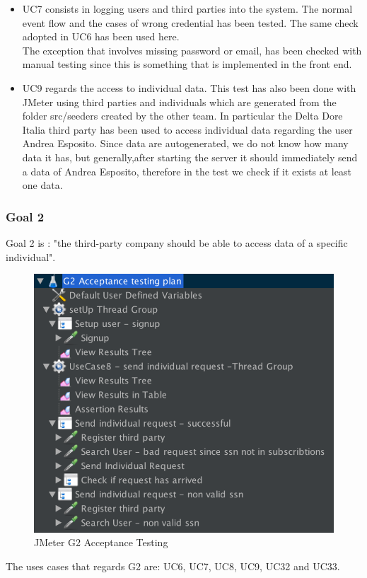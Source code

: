 \begin{itemize}
\item UC7 consists in logging users and third parties into the system. The normal event flow and the cases of wrong credential has been
tested.
The same check adopted in UC6 has been used here. \\ 
The exception that involves missing password or email, has been checked with manual testing since this is something that is implemented in the front 
end.

\item UC9 regards the access to individual data. This test has also been done with JMeter using third parties and individuals which are generated from the folder src/seeders created by the other team. In particular the Delta Dore Italia third party has been used to access individual data regarding the user Andrea Esposito. Since data are autogenerated, we do not know how many data it has, but generally,after starting the server it should immediately send a data of Andrea Esposito, therefore in the test we check if it exists at least one data.

\end{itemize}


\subsubsection{Goal 2}
Goal 2 is : "the third-party company should be able to access data of a specific individual".

\begin{figure}[H]
\includegraphics[width=0.7\linewidth]{images/goal2}
\centering
\caption{ JMeter G2 Acceptance Testing }
\label{fig:goal2}
\end{figure}

The uses cases that regards G2 are: UC6, UC7, UC8, UC9, UC32 and UC33.  

